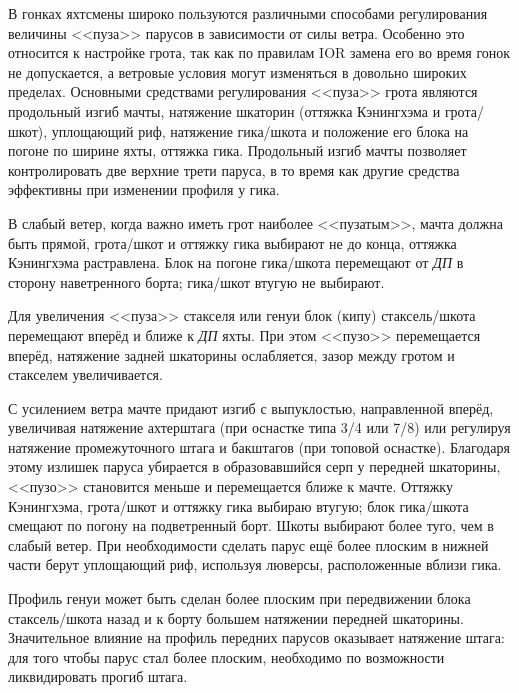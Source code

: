 В гонках яхтсмены широко пользуются различными способами регулирования
величины <<пуза>> парусов в зависимости от силы ветра. Особенно это
относится к настройке грота, так как по правилам IOR замена его во
время гонок не допускается, а ветровые условия могут изменяться в
довольно широких пределах. Основными средствами регулирования <<пуза>>
грота являются продольный изгиб мачты, натяжение шкаторин (оттяжка
Кэнингхэма и грота\-/шкот), уплощающий риф, натяжение гика\-/шкота и
положение его блока на погоне по ширине яхты, оттяжка гика. Продольный
изгиб мачты позволяет контролировать две верхние трети паруса, в то
время как другие средства эффективны при изменении профиля у гика.

В слабый ветер, когда важно иметь грот наиболее <<пузатым>>, мачта
должна быть прямой, грота\-/шкот и оттяжку гика выбирают не до конца,
оттяжка Кэнингхэма растравлена. Блок на погоне гика\-/шкота перемещают
от \textit{ДП} в сторону наветренного борта; гика\-/шкот втугую не
выбирают.

Для увеличения <<пуза>> стакселя или генуи блок (кипу)
стаксель\-/шкота перемещают вперёд и ближе к \textit{ДП} яхты. При
этом <<пузо>> перемещается вперёд, натяжение задней шкаторины
ослабляется, зазор между гротом и стакселем увеличивается.

С усилением ветра мачте придают изгиб с выпуклостью, направленной
вперёд, увеличивая натяжение ахтерштага (при оснастке типа 3/4 или
7/8) или регулируя натяжение промежуточного штага и бакштагов (при
топовой оснастке). Благодаря этому излишек паруса убирается в
образовавшийся серп у передней шкаторины, <<пузо>> становится меньше и
перемещается ближе к мачте. Оттяжку Кэнингхэма, грота\-/шкот и оттяжку
гика выбираю втугую; блок гика\-/шкота смещают по погону на
подветренный борт. Шкоты выбирают более туго, чем в слабый ветер. При
необходимости сделать парус ещё более плоским в нижней части берут
уплощающий риф, используя люверсы, расположенные вблизи гика.

Профиль генуи может быть сделан более плоским при передвижении блока
стаксель\-/шкота назад и к борту большем натяжении передней
шкаторины. Значительное влияние на профиль передних парусов оказывает
натяжение штага: для того чтобы парус стал более плоским, необходимо
по возможности ликвидировать прогиб штага.

